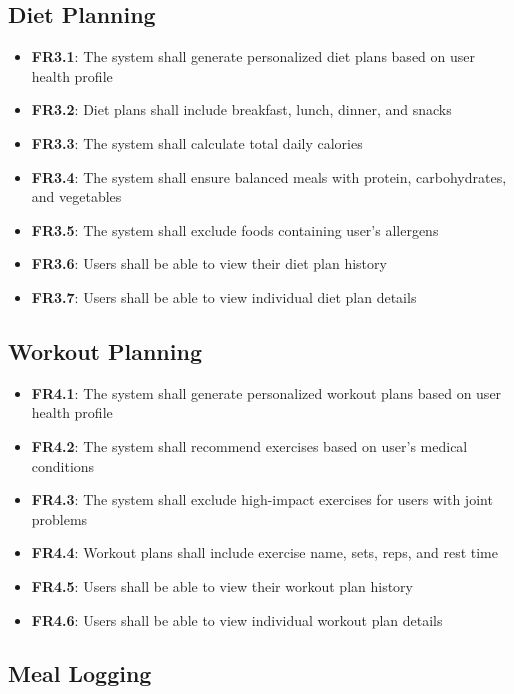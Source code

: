 \subsection{Diet Planning}

\begin{itemize}
    \item \textbf{FR3.1}: The system shall generate personalized diet plans based on user health profile
    \item \textbf{FR3.2}: Diet plans shall include breakfast, lunch, dinner, and snacks
    \item \textbf{FR3.3}: The system shall calculate total daily calories
    \item \textbf{FR3.4}: The system shall ensure balanced meals with protein, carbohydrates, and vegetables
    \item \textbf{FR3.5}: The system shall exclude foods containing user's allergens
    \item \textbf{FR3.6}: Users shall be able to view their diet plan history
    \item \textbf{FR3.7}: Users shall be able to view individual diet plan details
\end{itemize}

\subsection{Workout Planning}

\begin{itemize}
    \item \textbf{FR4.1}: The system shall generate personalized workout plans based on user health profile
    \item \textbf{FR4.2}: The system shall recommend exercises based on user's medical conditions
    \item \textbf{FR4.3}: The system shall exclude high-impact exercises for users with joint problems
    \item \textbf{FR4.4}: Workout plans shall include exercise name, sets, reps, and rest time
    \item \textbf{FR4.5}: Users shall be able to view their workout plan history
    \item \textbf{FR4.6}: Users shall be able to view individual workout plan details
\end{itemize}

\subsection{Meal Logging}

